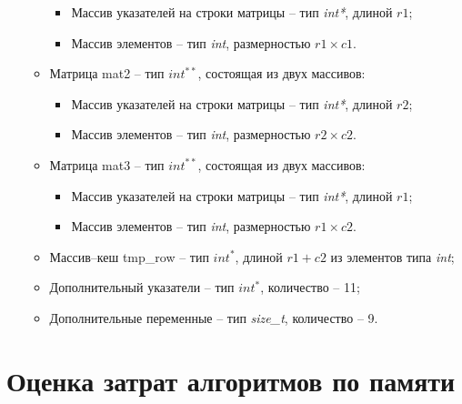 \begin{enumerate}
\begin{itemize}
        \begin{itemize}
            \item Массив указателей на строки матрицы -- тип \textit{int*}, длиной \( r1 \);
            \item Массив элементов -- тип \textit{int}, размерностью \( r1 \times c1 \).
        \end{itemize}
        \item Матрица mat2 -- тип \textit{$int^{**}$}, состоящая из двух массивов:
        \begin{itemize}
            \item Массив указателей на строки матрицы -- тип \textit{int*}, длиной \( r2 \);
            \item Массив элементов -- тип \textit{int}, размерностью \( r2 \times c2 \).
        \end{itemize}
        \item Матрица mat3 -- тип \textit{$int^{**}$}, состоящая из двух массивов:
        \begin{itemize}
            \item Массив указателей на строки матрицы -- тип \textit{int*}, длиной \( r1 \);
            \item Массив элементов -- тип \textit{int}, размерностью \( r1 \times c2 \).
        \end{itemize}
        \item Массив--кеш tmp\_row -- тип \textit{$int^{*}$}, длиной \( r1 + c2 \) из элементов типа \textit{int};
        \item Дополнительный указатели -- тип \textit{$int^{*}$}, количество -- 11;
        \item Дополнительные переменные -- тип \textit{size\_t}, количество -- 9.
    \end{itemize}
\end{enumerate}

\section{Оценка затрат алгоритмов по памяти}

